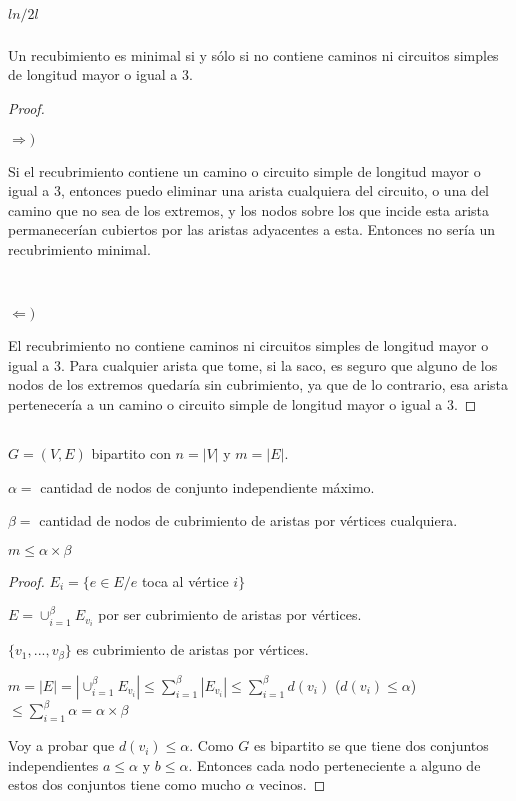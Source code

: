 \subsubsection{}
$ln/2l$

\subsubsection{}
\begin{lema}
	Un recubimiento es minimal si y sólo si no contiene caminos ni circuitos
	simples de longitud mayor o igual a 3.
\end{lema}

\begin{proof}

	~

	$\Longrightarrow )$

	Si el recubrimiento contiene un camino o circuito simple de longitud
	mayor o igual a 3, entonces puedo eliminar una arista cualquiera del
	circuito, o una del camino que no sea de los extremos, y los nodos sobre
	los que incide esta arista permanecerían cubiertos por las aristas
	adyacentes a esta. Entonces no sería un recubrimiento minimal.

	~

	$\Longleftarrow )$

	El recubrimiento no contiene caminos ni circuitos simples de longitud
	mayor o igual a 3. Para cualquier arista que tome, si la saco, es seguro
	que alguno de los nodos de los extremos quedaría sin cubrimiento, ya que
	de lo contrario, esa arista pertenecería a un camino o circuito simple de
	longitud mayor o igual a 3.


\end{proof}

\setcounter{subsection}{4}
\subsection{}
$G = (V, E)$ bipartito con $n = |V|$ y $m = |E|$.

$\alpha =$ cantidad de nodos de conjunto independiente máximo.

$\beta =$ cantidad de nodos de cubrimiento de aristas por vértices cualquiera.

$m \leq \alpha \times \beta$

\begin{proof}
	$E_i = \{e \in E / e$ toca al vértice $i\}$

	$E = \cup_{i = 1}^{\beta}E_{v_i}$ por ser cubrimiento de aristas por
	vértices.

	$\{v_1, ..., v_{\beta}\}$ es cubrimiento de aristas por vértices.

	$m = |E| = |\cup_{i = 1}^{\beta}E_{v_i}| \leq \sum_{i = 1}^{\beta}|E_{v_i}| \leq \sum_{i = 1}^{\beta}d(v_i)$ ($d(v_i) \leq \alpha$) $\leq \sum_{i = 1}^{\beta}\alpha = \alpha \times \beta$

	Voy a probar que $d(v_i) \leq \alpha$. Como $G$ es bipartito se que tiene
	dos conjuntos independientes $a \leq \alpha$ y $b \leq \alpha$. Entonces
	cada nodo perteneciente a alguno de estos dos conjuntos tiene como mucho
	$\alpha$ vecinos.
\end{proof}

